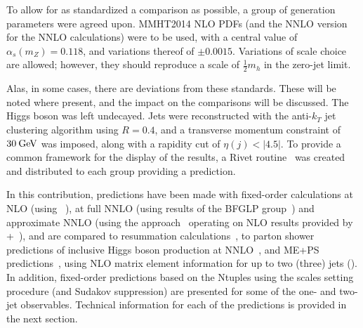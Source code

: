 To allow for as standardized a comparison as possible, a group of
generation parameters were agreed upon. MMHT2014 NLO PDFs (and the
NNLO version for the NNLO calculations) were to be used, with a
central value of $\alpha_s(m_Z)=0.118$, and variations thereof of
$\pm0.0015$.  Variations of scale choice are allowed; however, they
should reproduce a scale of $\tfrac{1}{2}m_h$ in the zero-jet limit.

Alas, in some cases, there are deviations from these standards. These
will be noted where present, and the impact on the comparisons will be
discussed.  The Higgs boson was left undecayed. Jets were
reconstructed with the anti-$k_T$ jet clustering algorithm using
$R=0.4$, and a transverse momentum constraint of $30\text{\:GeV}$ was imposed,
along with a rapidity cut of $\eta(j)<|4.5|$.  To provide a common
framework for the display of the results, a Rivet
routine~\cite{Rivet_routine} was created and distributed to each group
providing a prediction.

In this contribution, predictions have been made with fixed-order
calculations at NLO (using \GoSam~\cite{gosam}), at full
NNLO (using results of the BFGLP group~\cite{Petriello})  and approximate NNLO (using the \Loopsim
approach~\cite{LoopSim} operating on NLO results provided by
\GoSam+\Sherpa~\cite{LoopSim}), and are compared to resummation
calculations~\cite{HqT,HEJ,etc}, to parton shower predictions of
inclusive Higgs boson production at NNLO~\cite{PowhegNNLOPS, SherpaNNLOPS},
and ME+PS predictions~\cite{MG5,Sherpa,Herwig7}, using NLO matrix
element information for up to two (three) jets (\Sherpa). In addition,
fixed-order predictions based on the \GoSam Ntuples using the \Minlo
scales setting procedure (and Sudakov suppression) are presented for
some of the one- and two-jet observables. Technical information for
each of the predictions is provided in the next section.
